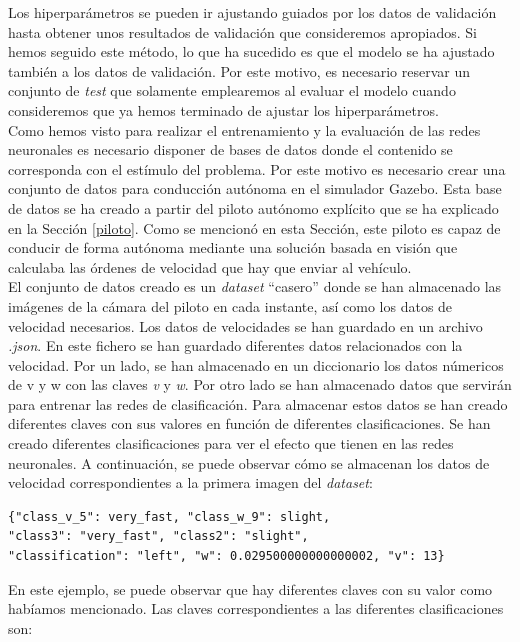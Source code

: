 Los hiperparámetros se pueden ir ajustando guiados por los datos de validación hasta obtener unos resultados de validación que consideremos apropiados. Si hemos seguido este método, lo que ha sucedido es que el modelo se ha ajustado también a los datos de validación. Por este motivo, es necesario reservar un conjunto de \textit{test} que solamente emplearemos al evaluar el modelo cuando consideremos que ya hemos terminado de ajustar los hiperparámetros.\\

Como hemos visto para realizar el entrenamiento y la evaluación de las redes neuronales es necesario disponer de bases de datos donde el contenido se corresponda con el estímulo del problema. Por este motivo es necesario crear una conjunto de datos para conducción autónoma en el simulador Gazebo. Esta base de datos se ha creado a partir del piloto autónomo explícito que se ha explicado en la Sección \ref{piloto}. Como se mencionó en esta Sección, este piloto es capaz de conducir de forma autónoma mediante una solución basada en visión que calculaba las órdenes de velocidad que hay que enviar al vehículo.\\

El conjunto de datos creado es un \textit{dataset} ``casero'' donde se han almacenado las imágenes de la cámara del piloto en cada instante, así como los datos de velocidad necesarios. Los datos de velocidades se han guardado en un archivo \textit{.json}. En este fichero se han guardado diferentes datos relacionados con la velocidad. Por un lado, se han almacenado en un diccionario los datos númericos de v y w con las claves \textit{v} y \textit{w}. Por otro lado se han almacenado datos que servirán para entrenar las redes de clasificación. Para almacenar estos datos se han creado diferentes claves con sus valores en función de diferentes clasificaciones. Se han creado diferentes clasificaciones para ver el efecto que tienen en las redes neuronales. A continuación, se puede observar cómo se almacenan los datos de velocidad correspondientes a la primera imagen del \textit{dataset}:\\

\begin{lstlisting}
{"class_v_5": very_fast, "class_w_9": slight, 
"class3": "very_fast", "class2": "slight", 
"classification": "left", "w": 0.029500000000000002, "v": 13}
\end{lstlisting}
\vspace{20pt}

En este ejemplo, se puede observar que hay diferentes claves con su valor como habíamos mencionado. Las claves correspondientes a las diferentes clasificaciones son:

